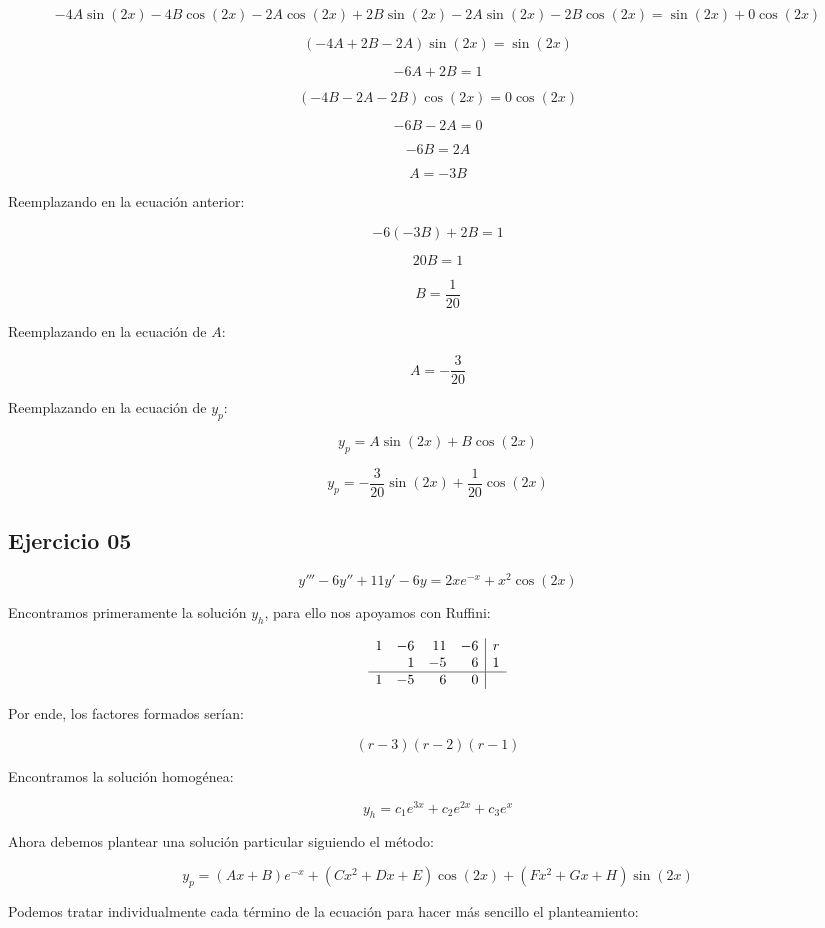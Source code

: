 \[
-4A\sin(2x) - 4B\cos(2x) - 2A\cos(2x) + 2B\sin(2x) - 2A\sin(2x) -2B\cos(2x) = \sin(2x) + 0\cos(2x)
\]

\[
(-4A + 2B - 2A) \sin(2x) = \sin(2x)
\]

\[
-6A + 2B = 1
\]

\[
(-4B - 2A - 2B) \cos(2x) = 0\cos(2x)
\]

\[
-6B - 2A = 0
\]

\[
-6B = 2A
\]

\[
A = -3B
\]

Reemplazando en la ecuación anterior:

\[
-6(-3B) + 2B = 1
\]

\[
20B = 1
\]

\[
B = \frac{1}{20}
\]

Reemplazando en la ecuación de \( A \):

\[
A = -\frac{3}{20}
\]

Reemplazando en la ecuación de \( y_p \):

\[
y_p = A\sin(2x) + B\cos(2x)
\]

\[
y_p = -\frac{3}{20} \sin(2x) + \frac{1}{20} \cos(2x)
\]

\subsection*{Ejercicio 05}
\[
y''' - 6y'' + 11y' - 6y = 2x e^{-x} + x^2 \cos(2x)
\]

Encontramos primeramente la solución \( y_h \), para ello nos apoyamos con Ruffini:

\[
\begin{array}{r r r r|r}
1 & -6 & 11 & -6 & r\\
 & 1 & -5 & 6 & 1\\
\hline
1 & -5 & 6 & 0 & 
\end{array}
\]

Por ende, los factores formados serían:

\[
( r - 3)( r - 2)( r - 1)
\]

Encontramos la solución homogénea:

\[
y_h = c_1 e^{3x} + c_2 e^{2x} + c_3 e^{x}
\]

Ahora debemos plantear una solución particular siguiendo el método:

\[
y_p = ( Ax + B) e^{-x} + ( Cx^2 + Dx + E) \cos(2x) + ( Fx^2 + Gx + H) \sin(2x)
\]

Podemos tratar individualmente cada término de la ecuación para hacer más sencillo el planteamiento:

